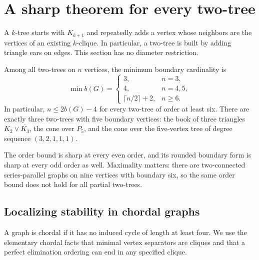 \section{A sharp theorem for every two-tree}\label{sec:twotree}
A $k$-tree starts with $K_{k+1}$ and repeatedly adds a vertex whose neighbors
are the vertices of an existing $k$-clique. In particular, a two-tree is built
by adding triangle ears on edges. This section has no diameter restriction.

\begin{theorem}\label{thm:twotree}
Among all two-trees on $n$ vertices, the minimum boundary cardinality is
\[
 \min b(G)=
 \begin{cases}
 3,&n=3,\\
 4,&n=4,5,\\
 \lceil n/2\rceil+2,&n\ge6.
 \end{cases}
\]
In particular, $n\le2b(G)-4$ for every two-tree of order at least six.
There are exactly three two-trees with five boundary vertices: the book of
three triangles $K_2\vee\overline{K_3}$, the cone over $P_5$, and the cone
over the five-vertex tree of degree sequence $(3,2,1,1,1)$.
\end{theorem}
The order bound is sharp at every even order, and its rounded boundary form
is sharp at every odd order as well. Maximality matters: there are
two-connected series-parallel graphs on nine vertices with boundary six,
so the same order bound does not hold for all partial two-trees.

\subsection{Localizing stability in chordal graphs}
A graph is chordal if it has no induced cycle of length at least four.
We use the elementary chordal facts that minimal vertex separators are
cliques and that a perfect elimination ordering can end in any specified
clique.

